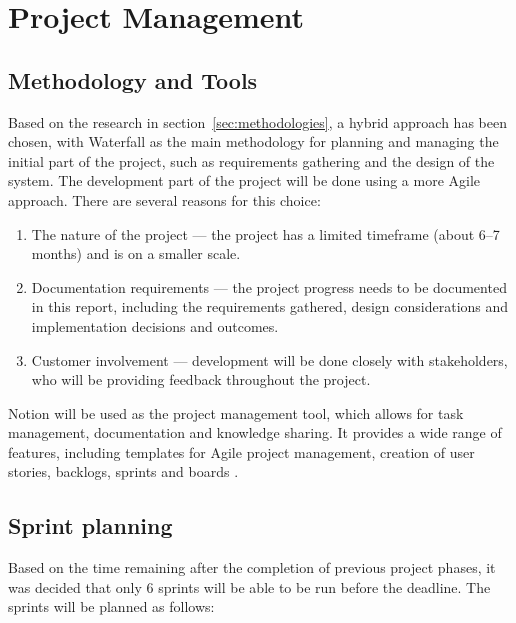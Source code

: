 \section{Project Management}

\subsection{Methodology and Tools}

Based on the research in section~\ref{sec:methodologies}, a hybrid approach has been chosen, with Waterfall as the main methodology for planning and managing the initial part of the project, such as requirements gathering and the design of the system. The development part of the project will be done using a more Agile approach. There are several reasons for this choice:

\begin{enumerate}
    \item The nature of the project --- the project has a limited timeframe (about 6--7 months) and is on a smaller scale. 
    \item Documentation requirements --- the project progress needs to be documented in this report, including the requirements gathered, design considerations and implementation decisions and outcomes.
    \item Customer involvement --- development will be done closely with stakeholders, who will be providing feedback throughout the project.
\end{enumerate}

Notion will be used as the project management tool, which allows for task management, documentation and knowledge sharing. It provides a wide range of features, including templates for Agile project management, creation of user stories, backlogs, sprints and boards \parencite{notion}. 

\subsection{Sprint planning}

Based on the time remaining after the completion of previous project phases, it was decided that only 6 sprints will be able to be run before the deadline. The sprints will be planned as follows:

